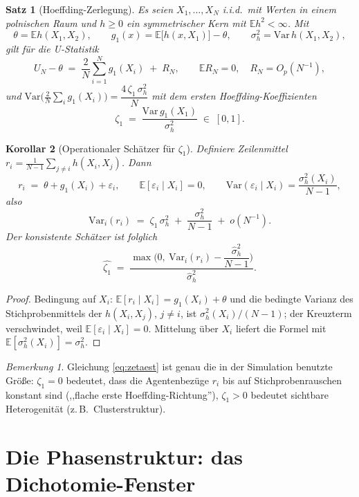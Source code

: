 \documentclass[11pt,a4paper]{article}
\newtheorem{satz}{Satz}
\newtheorem{korollar}[satz]{Korollar}
\theoremstyle{remark}
\newtheorem{bemerkung}{Bemerkung}
\newcommand{\E}{\mathbb{E}}
\begin{document}
\begin{satz}[Hoeffding-Zerlegung]\label{thm:hoeffding}
Es seien $X_1,\dots,X_N$ i.i.d.\ mit Werten in einem polnischen Raum und
$h\ge0$ ein symmetrischer Kern mit $\E h^2<\infty$. Mit
\[
\theta=\E h(X_1,X_2),\qquad
g_1(x)=\E\big[h(x,X_1)\big]-\theta,\qquad
\sigma_h^2=\mathrm{Var}\,h(X_1,X_2),
\]
gilt für die U-Statistik
\[
U_N-\theta \;=\;\frac{2}{N}\sum_{i=1}^N g_1(X_i)\;+\;R_N,
\qquad \E R_N=0,\quad R_N=O_p(N^{-1}),
\]
und $\mathrm{Var}\big(\tfrac2N\sum_i g_1(X_i)\big)=\dfrac{4\,\zeta_1\,\sigma_h^2}{N}$
mit dem \emph{ersten Hoeffding-Koeffizienten}
\[
\zeta_1\;=\;\frac{\mathrm{Var}\,g_1(X_1)}{\sigma_h^2}\;\in\;[0,1].
\]
\end{satz}

\begin{korollar}[Operationaler Schätzer für $\zeta_1$]\label{kor:zeta}
Definiere Zeilenmittel $r_i=\frac{1}{N-1}\sum_{j\ne i}h(X_i,X_j)$. Dann
\[
r_i \;=\;\theta+g_1(X_i)+\varepsilon_i,\qquad
\E[\varepsilon_i\mid X_i]=0,\qquad
\mathrm{Var}(\varepsilon_i\mid X_i)=\frac{\sigma_h^2(X_i)}{N-1},
\]
also
\[
\mathrm{Var}_i(r_i)\;=\;\zeta_1\,\sigma_h^2\;+\;\frac{\sigma_h^2}{N-1}\;+\;o(N^{-1}).
\]
Der konsistente Schätzer ist folglich
\begin{equation}\label{eq:zetaest}
\widehat{\zeta_1}\;=\;\frac{\max\!\Big(0,\ \mathrm{Var}_i(r_i)-\dfrac{\widehat\sigma_h^2}{N-1}\Big)}{\widehat\sigma_h^2}.
\end{equation}
\end{korollar}
\begin{proof}
Bedingung auf $X_i$: $\E[r_i\mid X_i]=g_1(X_i)+\theta$ und die bedingte
Varianz des Stichprobenmittels der $h(X_i,X_j)$, $j\ne i$, ist
$\sigma_h^2(X_i)/(N-1)$; der Kreuzterm verschwindet, weil
$\E[\varepsilon_i\mid X_i]=0$. Mittelung über $X_i$ liefert die Formel mit
$\E[\sigma_h^2(X_i)]=\sigma_h^2$.
\end{proof}

\begin{bemerkung}
Gleichung \eqref{eq:zetaest} ist genau die in der Simulation benutzte
Größe: $\zeta_1=0$ bedeutet, dass die Agentenbezüge $r_i$ bis auf
Stichprobenrauschen konstant sind (,,flache erste Hoeffding-Richtung''),
$\zeta_1>0$ bedeutet sichtbare Heterogenität (z.\,B.\ Clusterstruktur).
\end{bemerkung}

\section{Die Phasenstruktur: das Dichotomie-Fenster}
\end{document}
